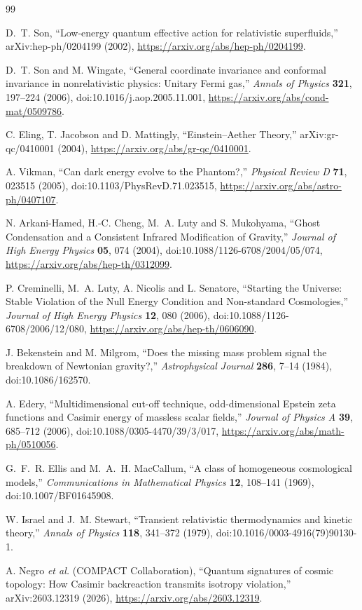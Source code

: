 \begin{thebibliography}{99}
\small

D.~T. Son,
``Low-energy quantum effective action for relativistic superfluids,''
arXiv:hep-ph/0204199 (2002),
\url{https://arxiv.org/abs/hep-ph/0204199}.

D.~T. Son and M. Wingate,
``General coordinate invariance and conformal invariance in nonrelativistic
physics: Unitary Fermi gas,''
\emph{Annals of Physics} \textbf{321}, 197--224 (2006),
doi:10.1016/j.aop.2005.11.001,
\url{https://arxiv.org/abs/cond-mat/0509786}.

C. Eling, T. Jacobson and D. Mattingly,
``Einstein--Aether Theory,''
arXiv:gr-qc/0410001 (2004),
\url{https://arxiv.org/abs/gr-qc/0410001}.

A. Vikman,
``Can dark energy evolve to the Phantom?,''
\emph{Physical Review D} \textbf{71}, 023515 (2005),
doi:10.1103/PhysRevD.71.023515,
\url{https://arxiv.org/abs/astro-ph/0407107}.

N. Arkani-Hamed, H.-C. Cheng, M.~A. Luty and S. Mukohyama,
``Ghost Condensation and a Consistent Infrared Modification of Gravity,''
\emph{Journal of High Energy Physics} \textbf{05}, 074 (2004),
doi:10.1088/1126-6708/2004/05/074,
\url{https://arxiv.org/abs/hep-th/0312099}.

P. Creminelli, M.~A. Luty, A. Nicolis and L. Senatore,
``Starting the Universe: Stable Violation of the Null Energy Condition and
Non-standard Cosmologies,''
\emph{Journal of High Energy Physics} \textbf{12}, 080 (2006),
doi:10.1088/1126-6708/2006/12/080,
\url{https://arxiv.org/abs/hep-th/0606090}.

J. Bekenstein and M. Milgrom,
``Does the missing mass problem signal the breakdown of Newtonian gravity?,''
\emph{Astrophysical Journal} \textbf{286}, 7--14 (1984),
doi:10.1086/162570.

A. Edery,
``Multidimensional cut-off technique, odd-dimensional Epstein zeta functions
and Casimir energy of massless scalar fields,''
\emph{Journal of Physics A} \textbf{39}, 685--712 (2006),
doi:10.1088/0305-4470/39/3/017,
\url{https://arxiv.org/abs/math-ph/0510056}.

G.~F.~R. Ellis and M.~A.~H. MacCallum,
``A class of homogeneous cosmological models,''
\emph{Communications in Mathematical Physics} \textbf{12}, 108--141 (1969),
doi:10.1007/BF01645908.

W. Israel and J.~M. Stewart,
``Transient relativistic thermodynamics and kinetic theory,''
\emph{Annals of Physics} \textbf{118}, 341--372 (1979),
doi:10.1016/0003-4916(79)90130-1.

A. Negro \emph{et al.} (COMPACT Collaboration),
``Quantum signatures of cosmic topology: How Casimir backreaction transmits
isotropy violation,'' arXiv:2603.12319 (2026),
\url{https://arxiv.org/abs/2603.12319}.

\end{thebibliography}
